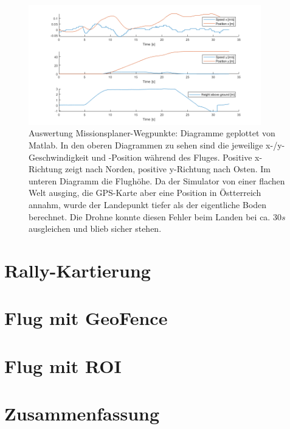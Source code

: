 \begin{figure}[h]
    \centering
    \includegraphics[width=0.9\textwidth]{images/mission_plan_mission_dia.png}
    \caption[Auswertung Missionsplaner-Wegpunkte]{Auswertung Missionsplaner-Wegpunkte: Diagramme geplottet von Matlab. In den oberen Diagrammen zu sehen sind die jeweilige x-/y-Geschwindigkeit und -Position während des Fluges. Positive x-Richtung zeigt nach Norden, positive y-Richtung nach Osten. Im unteren Diagramm die Flughöhe. Da der Simulator von einer flachen Welt ausging, die GPS-Karte aber eine Position in Östterreich annahm, wurde der Landepunkt tiefer als der eigentliche Boden berechnet. Die Drohne konnte diesen Fehler beim Landen bei ca. $30s$ ausgleichen und blieb sicher stehen.}
    \label{fig:qgc_mission_plan_wp_dia}
\end{figure}

\section{Rally-Kartierung}

\section{Flug mit GeoFence}

\section{Flug mit ROI}

\section{Zusammenfassung}


